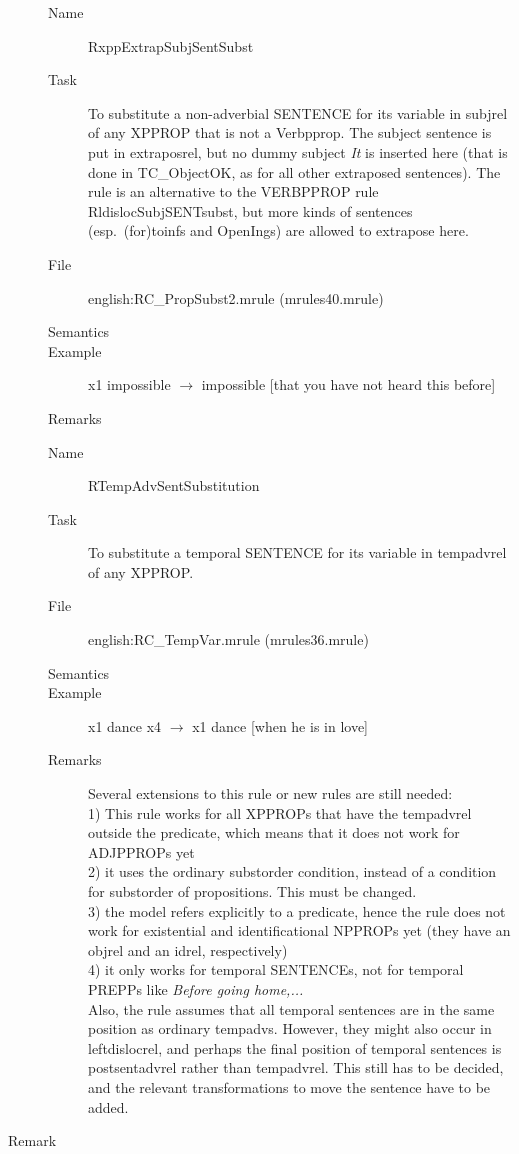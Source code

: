 \begin{description}
\vspace{1 cm}
\begin{description}
\item[Name] RxppExtrapSubjSentSubst
\item[Task] To substitute a non-adverbial SENTENCE for its variable in 
subjrel of any XPPROP that is not a Verbpprop. The subject sentence is put in 
extraposrel, but no dummy subject {\em It\/} is inserted here (that is done in 
TC\_ObjectOK, as for all other extraposed sentences).
The rule is an alternative to the VERBPPROP rule RldislocSubjSENTsubst, but 
more kinds of sentences (esp.\ (for)toinfs and OpenIngs) are allowed to 
extrapose here.
\item[File] english:RC\_PropSubst2.mrule (mrules40.mrule)
\item[Semantics]
\item[Example] x1 impossible $\rightarrow$ impossible [that you have not heard 
this before]
\item[Remarks]
\end{description}

\vspace{1 cm}
\begin{description}
\item[Name] RTempAdvSentSubstitution
\item[Task] To substitute a temporal SENTENCE for its variable in 
tempadvrel of any XPPROP. 
\item[File] english:RC\_TempVar.mrule (mrules36.mrule)
\item[Semantics]
\item[Example] x1 dance x4 $\rightarrow$ x1 dance [when he is in love]
\item[Remarks] Several extensions to this rule or new rules are still needed: \\
1) This rule works for all XPPROPs that have the tempadvrel outside the 
predicate, which means that it does not work for ADJPPROPs yet\\
2) it uses the ordinary substorder condition, instead of a condition for 
subst\-order of propositions. This must be changed.\\
3) the model refers explicitly to a predicate, hence the rule does not work 
for existential and identificational NPPROPs yet (they have an objrel and an 
idrel, respectively)\\
4) it only works for temporal SENTENCEs, not for temporal PREPPs like {\em 
Before going home,...\/}\\
Also, the rule assumes that all temporal sentences are in the same position as 
ordinary tempadvs. However, they might also occur in leftdislocrel, and perhaps 
the final position of temporal sentences is postsentadvrel rather than 
tempadvrel. This still has to be decided, and the relevant transformations to 
move the sentence have to be added.
\end{description}

\item[Remark]
\end{description}


